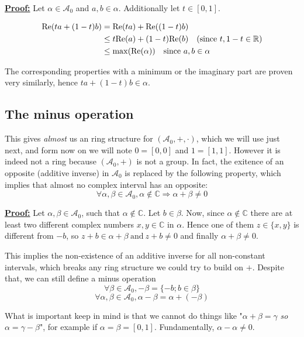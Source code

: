 \noindent \underline{\textbf{Proof:}} Let $\alpha \in \mathcal{A}_0$ and $a, b \in \alpha$. Additionally let $t \in [0, 1]$.

\begin{align*}
\mathrm{Re}(ta+(1-t)b) &= \mathrm{Re}(ta) + \mathrm{Re}((1-t)b) \\
&\le t\mathrm{Re}(a) + (1-t)\mathrm{Re}(b) \quad (\text{since}~t, 1-t \in \mathbb{R}) \\
&\le \max(\mathrm{Re}(\alpha)) \quad \text{since}~a, b \in \alpha
\end{align*}

The corresponding properties with a minimum or the imaginary part are proven very similarly, hence $ta+(1-t)b \in \alpha$.
\hfill{} $\boxed{}$

\subsection{The minus operation}

This gives \textit{almost} us an ring structure for $(\mathcal{A}_0, +, \cdot)$, which we will use just next, and form now on we will note $0 = [0, 0]$ and $1 = [1, 1]$. However it is indeed not a ring because $(\mathcal{A}_0, +)$ is not a group. In fact, the exitence of an opposite (additive inverse) in $\mathcal{A}_0$ is replaced by the following property, which implies that almost no complex interval has an opposite:
$$\forall \alpha,\beta \in \mathcal{A}_0, \alpha \not\in \mathbb{C} \Rightarrow \alpha + \beta \not= 0$$

\noindent \underline{\textbf{Proof:}} Let $\alpha, \beta \in \mathcal{A}_0$, such that $\alpha \not\in \mathbb{C}$. Let $b \in \beta$.
Now, since $\alpha \not\in \mathbb{C}$ there are at least two different complex numbers $x, y \in \mathbb{C}$ in $\alpha$. Hence one of them $z \in \{x, y\}$ is different from $-b$, so $z + b \in \alpha + \beta ~\text{and}~ z + b \not=0$ and finally $\alpha + \beta \not= 0$.
\hfill{} $\boxed{}$

\vspace{1em}
This implies the non-existence of an additive inverse for all non-constant intervals, which breaks any ring structure we could try to build on $+$. Despite that, we can still define a minus operation
$$\forall \beta \in \mathcal{A}_0, -\beta = \{-b ; b \in \beta\}$$
$$\forall \alpha, \beta \in \mathcal{A}_0, \alpha - \beta = \alpha + (- \beta)$$

What is important keep in mind is that we cannot do things like "$\alpha + \beta = \gamma$ \textit{so} $\alpha = \gamma - \beta$", for example if $\alpha = \beta = [0, 1]$. Fundamentally, $\alpha - \alpha \not= 0$.

